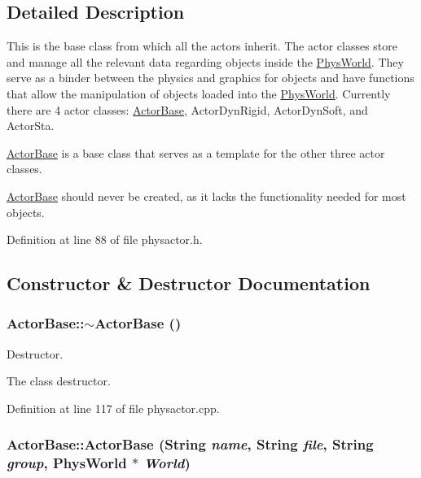 \subsection{Detailed Description}
This is the base class from which all the actors inherit. The actor classes store and manage all the relevant data regarding objects inside the \hyperlink{classPhysWorld}{PhysWorld}. They serve as a binder between the physics and graphics for objects and have functions that allow the manipulation of objects loaded into the \hyperlink{classPhysWorld}{PhysWorld}. Currently there are 4 actor classes: \hyperlink{classActorBase}{ActorBase}, ActorDynRigid, ActorDynSoft, and ActorSta. \par
 \hyperlink{classActorBase}{ActorBase} is a base class that serves as a template for the other three actor classes. \par
 \hyperlink{classActorBase}{ActorBase} should never be created, as it lacks the functionality needed for most objects. 

Definition at line 88 of file physactor.h.



\subsection{Constructor \& Destructor Documentation}
\hypertarget{classActorBase_a6fd984c46b3232c2522adb44be4dedb7}{
\subsubsection[{$\sim$ActorBase}]{\setlength{\rightskip}{0pt plus 5cm}ActorBase::$\sim$ActorBase ()}}
\label{dd/d7b/classActorBase_a6fd984c46b3232c2522adb44be4dedb7}


Destructor. 

The class destructor. 

Definition at line 117 of file physactor.cpp.

\hypertarget{classActorBase_a32337e36f62d5ffb6315fad932aa84d9}{
\subsubsection[{ActorBase}]{\setlength{\rightskip}{0pt plus 5cm}ActorBase::ActorBase (String {\em name}, \/  String {\em file}, \/  String {\em group}, \/  {\bf PhysWorld} $\ast$ {\em World})}}
\label{dd/d7b/classActorBase_a32337e36f62d5ffb6315fad932aa84d9}


